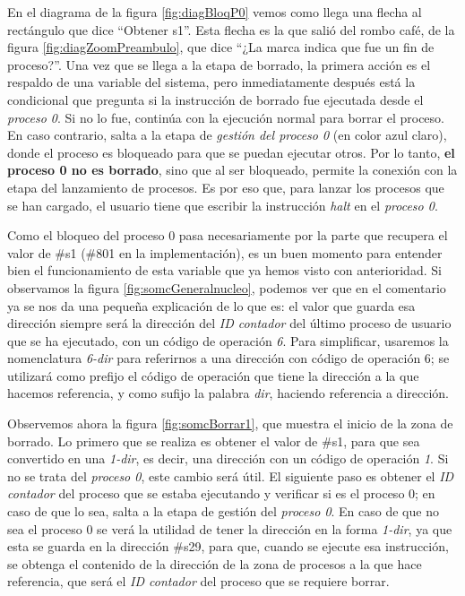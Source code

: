 \documentclass[letterpaper,12pt,oneside]{book}
\begin{document}
		En el diagrama de la figura \ref{fig:diagBloqP0} vemos como llega una flecha al rectángulo que dice ``Obtener s1''. Esta flecha
		es la que salió del rombo café, de la figura \ref{fig:diagZoomPreambulo}, que dice ``¿La marca indica que fue un fin de proceso?''.
		Una vez que se llega a la etapa de borrado, la primera acción
		es el respaldo de una variable del sistema, pero inmediatamente después está la condicional que pregunta si la instrucción
		de borrado fue ejecutada desde el \textit{proceso 0}. Si no lo fue, continúa con la ejecución normal para
		borrar el proceso. En caso contrario, salta a la etapa de \textit{gestión del proceso 0} (en color azul claro),
		donde el proceso es bloqueado para que se puedan ejecutar otros. Por lo tanto, \textbf{el proceso 0 no es borrado},
		sino que al ser bloqueado, permite la conexión con la etapa del lanzamiento de procesos. Es por eso que, para lanzar los procesos que se han 
		cargado, el usuario tiene que escribir la instrucción \textit{halt} en el \textit{proceso 0}.

        
        Como
		el bloqueo del proceso 0 pasa necesariamente por la parte que recupera el valor de \#s1 (\#801 en la implementación), es un buen momento para 
		entender bien el funcionamiento de esta variable que ya hemos visto con anterioridad. Si observamos la figura \ref{fig:somcGeneralnucleo}, podemos
		ver que en el comentario ya se nos da una pequeña explicación de lo que es: el valor que guarda esa dirección siempre será la dirección
		del \textit{ID contador} del último proceso de usuario que se ha ejecutado, con un código de operación \textit{6}. Para simplificar, 
		usaremos la nomenclatura
		\textit{6-dir} para referirnos a una dirección con código de operación 6;
		se utilizará como prefijo el código de operación que tiene la dirección a la que hacemos referencia, y como sufijo
		la palabra \textit{dir}, haciendo referencia a dirección.
  
        Observemos ahora la
		figura \ref{fig:somcBorrar1}, que muestra el inicio de la zona de borrado. Lo primero que se realiza es obtener el valor de \#s1, 
		para que sea convertido
		en una \textit{1-dir}, es decir, una dirección con un código de operación \textit{1}. Si no se trata del \textit{proceso 0}, este cambio
		será útil. El siguiente paso es  obtener el \textit{ID contador} del proceso que se estaba ejecutando y verificar si es el proceso
		0; en caso de que lo sea, salta a la etapa de gestión del \textit{proceso 0}. En caso de que no sea el proceso 0 se verá la utilidad
		de tener la dirección en 
		la forma \textit{1-dir}, ya que esta se guarda en 
		la dirección \#s29, para
        que, cuando se ejecute esa instrucción, se obtenga el contenido de la dirección de la zona de procesos
        a la que hace referencia, que será el \textit{ID contador} del proceso que se requiere borrar.
  
\end{document}
